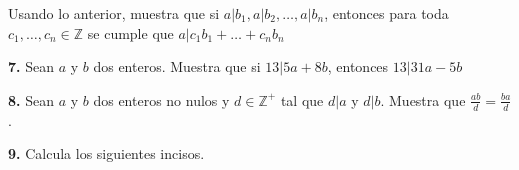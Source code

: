 \documentclass[12pt]{article}
\begin{document}
Usando lo anterior, muestra que si $a | b_1, a | b_2, \dots, a | b_n$, entonces para toda $c_1, \dots, c_n \in \mathbb{Z}$ se cumple que $a | c_1b_1 + \dots + c_nb_n$
\vspace{1cm}

%
%
\textbf{7.} Sean $a$ y $b$ dos enteros. Muestra que si $13 | 5a + 8b$, entonces $13|31a - 5b$\\

\vspace{1cm}

%
%
\textbf{8.} Sean $a$ y $b$ dos enteros no nulos y $d \in \mathbb{Z}^+$ tal que $d | a$ y $d | b$. Muestra que $\frac{ab}{d} = \frac{ba}{d}$.

\vspace{1cm}

%
%
\textbf{9.} Calcula los siguientes incisos.
\end{document}
